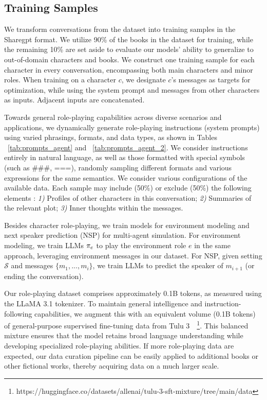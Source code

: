 \subsection{Training Samples}

We transform conversations from the \method dataset into training samples in the Sharegpt format.
We utilize 90\% of the books in the dataset for training, while the remaining 10\% are set aside to evaluate our models’ ability to generalize to out-of-domain characters and books. 
We construct one training sample for each character in every \method conversation, encompassing both main characters and minor roles.
When training on a character $c$, we designate $c$’s messages as targets for optimization, while using the system prompt and messages from other characters as inputs. Adjacent inputs are concatenated.

Towards general role-playing capabilities across diverse scenarios and applications, we dynamically generate role-playing instructions (system prompts) using varied phrasings, formats, and data types, as shown in Tables ~\ref{tab:prompts_agent} and ~\ref{tab:prompts_agent_2}. 
We consider instructions entirely in natural language, as well as those formatted with special symbols (such as \#\#\#, ===), randomly sampling different formats and various expressions for the same semantics. 
We consider various configurations of the available data. 
Each sample may include (50\%) or exclude (50\%)  the following elements : 
\textit{1)} Profiles of other characters in this conversation; 
\textit{2)} Summaries of the relevant plot;
\textit{3)} Inner thoughts within the messages.


Besides character role-playing, 
we train \method models for environment modeling and next speaker prediction (NSP) for multi-agent simulation. 
For environment modeling, we train LLMs $\pi_e$ to play the environment role $e$ in the same approach, leveraging environment messages in our dataset. 
For NSP, given setting $\mathcal{S}$ and messages $\{m_1,...,m_i\}$, we train LLMs to predict the speaker of $m_{i+1}$ (or ending the conversation).  

Our role-playing dataset comprises approximately 0.1B tokens, as measured using the LLaMA 3.1 tokenizer. 
To maintain general intelligence and instruction-following capabilities, we augment this with an equivalent volume (0.1B tokens) of general-purpose supervised fine-tuning data from Tulu 3~\citep{lambert2024tulu}~\footnote{https://huggingface.co/datasets/allenai/tulu-3-sft-mixture/tree/main/data}. 
This balanced mixture ensures that the model retains broad language understanding while developing specialized role-playing abilities.
If more role-playing data are expected, our data curation pipeline can be easily applied to additional books or other fictional works, thereby acquiring data on a much larger scale.

